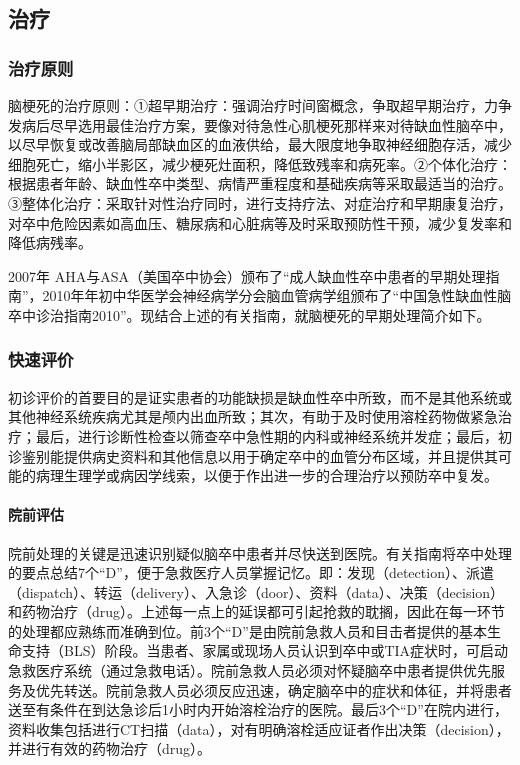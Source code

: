 \subsection{治疗}

\subsubsection{治疗原则}

脑梗死的治疗原则：①超早期治疗：强调治疗时间窗概念，争取超早期治疗，力争发病后尽早选用最佳治疗方案，要像对待急性心肌梗死那样来对待缺血性脑卒中，以尽早恢复或改善脑局部缺血区的血液供给，最大限度地争取神经细胞存活，减少细胞死亡，缩小半影区，减少梗死灶面积，降低致残率和病死率。②个体化治疗：根据患者年龄、缺血性卒中类型、病情严重程度和基础疾病等采取最适当的治疗。③整体化治疗：采取针对性治疗同时，进行支持疗法、对症治疗和早期康复治疗，对卒中危险因素如高血压、糖尿病和心脏病等及时采取预防性干预，减少复发率和降低病残率。

2007年
AHA与ASA（美国卒中协会）颁布了“成人缺血性卒中患者的早期处理指南”，2010年年初中华医学会神经病学分会脑血管病学组颁布了“中国急性缺血性脑卒中诊治指南2010”。现结合上述的有关指南，就脑梗死的早期处理简介如下。

\subsubsection{快速评价}

初诊评价的首要目的是证实患者的功能缺损是缺血性卒中所致，而不是其他系统或其他神经系统疾病尤其是颅内出血所致；其次，有助于及时使用溶栓药物做紧急治疗；最后，进行诊断性检查以筛查卒中急性期的内科或神经系统并发症；最后，初诊鉴别能提供病史资料和其他信息以用于确定卒中的血管分布区域，并且提供其可能的病理生理学或病因学线索，以便于作出进一步的合理治疗以预防卒中复发。

\paragraph{院前评估}

院前处理的关键是迅速识别疑似脑卒中患者并尽快送到医院。有关指南将卒中处理的要点总结7个“D”，便于急救医疗人员掌握记忆。即：发现（detection）、派遣（dispatch）、转运（delivery）、入急诊（door）、资料（data）、决策（decision）和药物治疗（drug）。上述每一点上的延误都可引起抢救的耽搁，因此在每一环节的处理都应熟练而准确到位。前3个“D”是由院前急救人员和目击者提供的基本生命支持（BLS）阶段。当患者、家属或现场人员认识到卒中或TIA症状时，可启动急救医疗系统（通过急救电话）。院前急救人员必须对怀疑脑卒中患者提供优先服务及优先转送。院前急救人员必须反应迅速，确定脑卒中的症状和体征，并将患者送至有条件在到达急诊后1小时内开始溶栓治疗的医院。最后3个“D”在院内进行，资料收集包括进行CT扫描（data），对有明确溶栓适应证者作出决策（decision），并进行有效的药物治疗（drug）。

